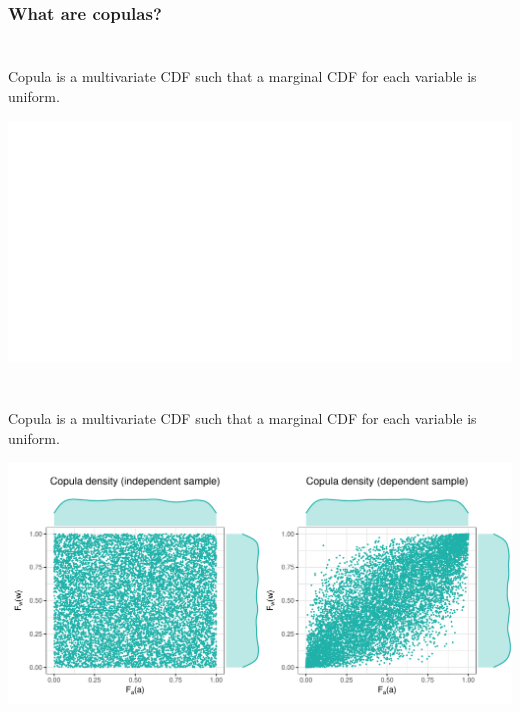 \documentclass[aspectratio=169]{beamer}
\begin{document}
		\subsubsection{What are copulas?}
			\begin{frame}
				\frametitle{\insertsubsubsection}
				~\\[1em]
				Copula is a multivariate CDF such that a marginal CDF for each variable is uniform. \\[1em]
				
				\begin{center}
					\includegraphics[width=0.75\linewidth]{plots/introduction/blank}
				\end{center}
				
			\end{frame}
			
			\begin{frame}
				\frametitle{\insertsubsubsection}
				~\\[1em]
				Copula is a multivariate CDF such that a marginal CDF for each variable is uniform. \\[1em]
				
				\begin{center}
					\includegraphics[width=0.75\linewidth]{plots/introduction/copulas}
				\end{center}
				
			\end{frame}
			
\end{document}
